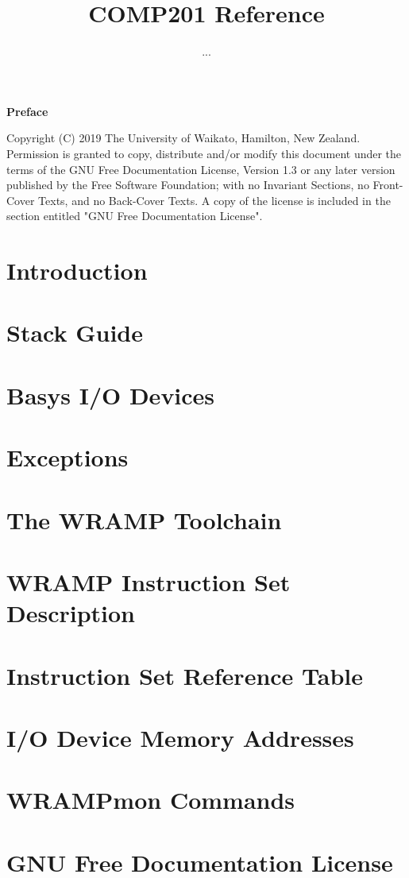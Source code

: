 \documentclass[a4paper]{book}
\title{COMP201 Reference}
\author{...}
\begin{document}

\begin{Huge}
\vspace{2cm}
\textbf{Preface}\\
\vspace{1.5cm}
\end{Huge}




Copyright (C) 2019 The University of Waikato, Hamilton, New Zealand.
Permission is granted to copy, distribute and/or modify this document
under the terms of the GNU Free Documentation License, Version 1.3
or any later version published by the Free Software Foundation;
with no Invariant Sections, no Front-Cover Texts, and no Back-Cover Texts.
A copy of the license is included in the section entitled "GNU
Free Documentation License".

\tableofcontents

\chapter{Introduction}
\label{chapter:intro}

\chapter{Stack Guide}
\label{chapter:stack}

\chapter{Basys I/O Devices}
\label{chapter:io}

\chapter{Exceptions}
\label{chapter:exceptions}

\appendix
\chapter{The WRAMP Toolchain}
\label{appendix:toolchain}

\chapter{WRAMP Instruction Set Description}
\label{appendix:instr}

\chapter{Instruction Set Reference Table}
\label{appendix:instrsm}
\addtolength{\hoffset}{-1cm}
\addtolength{\textwidth}{1cm}

\chapter{I/O Device Memory Addresses}
\label{appendix:memory-map}

\chapter{WRAMPmon Commands}
\label{appendix:wrampmon}


\chapter{GNU Free Documentation License}
\label{appendix:license}

\end{document}
